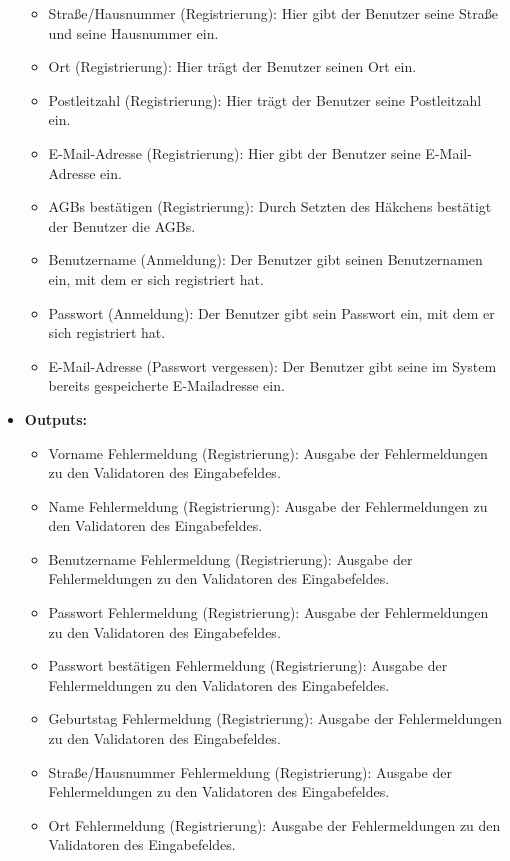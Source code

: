 \begin{itemize}
\begin{itemize}
							\item Straße/Hausnummer (Registrierung): Hier gibt der Benutzer seine Straße und seine Hausnummer ein.
							\item Ort (Registrierung): Hier trägt der Benutzer seinen Ort ein.
							\item Postleitzahl (Registrierung): Hier trägt der Benutzer seine Postleitzahl ein.
							\item E-Mail-Adresse (Registrierung): Hier gibt der Benutzer seine E-Mail-Adresse ein.
							\item AGBs bestätigen (Registrierung): Durch Setzten des Häkchens bestätigt der Benutzer die AGBs. 
							\item Benutzername (Anmeldung): Der Benutzer gibt seinen Benutzernamen ein, mit dem er sich registriert hat.
							\item Passwort (Anmeldung): Der Benutzer gibt sein Passwort ein, mit dem er sich registriert hat.
							\item E-Mail-Adresse (Passwort vergessen): Der Benutzer gibt seine im System bereits gespeicherte E-Mailadresse ein.
						\end{itemize}
					\item \textbf{Outputs:} 
						\begin{itemize}
							\item Vorname Fehlermeldung (Registrierung): Ausgabe der Fehlermeldungen zu den Validatoren des Eingabefeldes.
							\item Name Fehlermeldung (Registrierung): Ausgabe der Fehlermeldungen zu den Validatoren des Eingabefeldes.
							\item Benutzername Fehlermeldung (Registrierung): Ausgabe der Fehlermeldungen zu den Validatoren des Eingabefeldes.
							\item Passwort Fehlermeldung (Registrierung): Ausgabe der Fehlermeldungen zu den Validatoren des Eingabefeldes.
							\item Passwort bestätigen Fehlermeldung (Registrierung): Ausgabe der Fehlermeldungen zu den Validatoren des Eingabefeldes.
							\item Geburtstag Fehlermeldung (Registrierung): Ausgabe der Fehlermeldungen zu den Validatoren des Eingabefeldes.
							\item Straße/Hausnummer Fehlermeldung (Registrierung): Ausgabe der Fehlermeldungen zu den Validatoren des Eingabefeldes.
							\item Ort Fehlermeldung (Registrierung): Ausgabe der Fehlermeldungen zu den Validatoren des Eingabefeldes.

\end{itemize}
\end{itemize}
